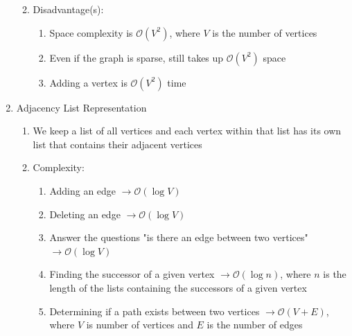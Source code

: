 \documentclass [12pt, executivepaper]{article}
\begin{document}
\begin{enumerate}
\begin{enumerate}
\begin{enumerate}
\end{enumerate}

\item Disadvantage(s):

\begin{enumerate}

\item Space complexity is $\mathcal{O}(V^2)$, where $V$ is the number of vertices

\item Even if the graph is sparse, still takes up $\mathcal{O}(V^2)$ space

\item Adding a vertex is $\mathcal{O}(V^2)$ time

\end{enumerate}

\end{enumerate}

\item Adjacency List Representation

\begin{enumerate}

\item We keep a list of all vertices and each vertex within that list has its own list that contains their adjacent vertices

\item Complexity:

\begin{enumerate}

\item Adding an edge $\rightarrow \mathcal{O}(\log{} V)$

\item Deleting an edge $\rightarrow \mathcal{O}(\log{} V)$

\item Answer the questions "is there an edge between two vertices"  $\rightarrow \mathcal{O}(\log{} V)$

\item Finding the successor of a given vertex $\rightarrow \mathcal{O}(\log{} n)$, where $n$ is the length of the lists containing the successors of a given vertex

\pagebreak

\vspace*{-40mm}

\item Determining if a path exists between two vertices $\rightarrow \mathcal{O}(V+E)$, where $V$ is number of vertices and $E$ is the number of edges


\end{enumerate}
\end{enumerate}
\end{enumerate}
\end{document}
